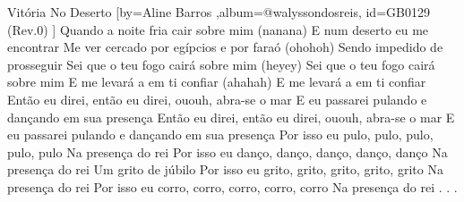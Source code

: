 \beginsong
{Vitória No Deserto %
}[by={Aline Barros %
},album={@walyssondosreis},
id={GB0129 %
(Rev.0) %
}]
\beginverse*
Quando a noite fria cair sobre mim (nanana)
E num deserto eu me encontrar
Me ver cercado por egípcios e por faraó (ohohoh)
Sendo impedido de prosseguir
\endverse
\beginverse*
Sei que o teu fogo cairá sobre mim (heyey)
Sei que o teu fogo cairá sobre mim
E me levará a em ti confiar (ahahah)
E me levará a em ti confiar
\endverse
\beginchorus
Então eu direi, então eu direi, ououh, abra-se o mar
E eu passarei pulando e dançando em sua presença
Então eu direi, então eu direi, ououh, abra-se o mar
E eu passarei pulando e dançando em sua presença
\endchorus
\beginverse*
Por isso eu pulo, pulo, pulo, pulo, pulo
Na presença do rei
Por isso eu danço, danço, danço, danço, danço
Na presença do rei
Um grito de júbilo
Por isso eu grito, grito, grito, grito, grito
Na presença do rei
Por isso eu corro, corro, corro, corro, corro
Na presença do rei
\endverse
\beginverse*
.
.
.
\endverse
\begin{comment}
\lstset{basicstyle=\scriptsize\bf} %
\tab{Solo 1}
\begin{lstlisting}
E|-----------------------------------------------------|
B|-----------------------------------------------------|
G|-----------------------------------------------------|
D|-----------------------------------------------------|
A|-----------------------------------------------------|
E|-----------------------------------------------------|
\end{lstlisting}
\end{comment}
\vspace{2em} 
